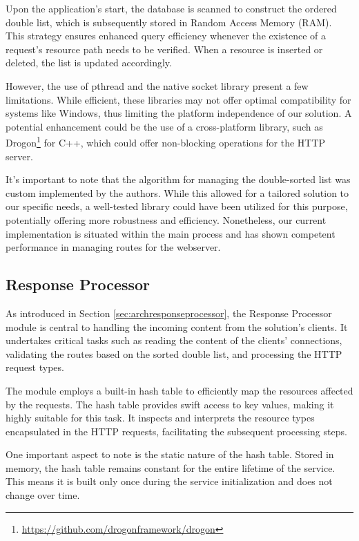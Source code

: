 \documentclass[a4paper,fleqn]{cas-dc}
\begin{document}
Upon the application's start, the database is scanned to construct the ordered double list, which is subsequently stored in Random Access Memory (RAM). This strategy ensures enhanced query efficiency whenever the existence of a request's resource path needs to be verified. When a resource is inserted or deleted, the list is updated accordingly.

However, the use of pthread and the native socket library present a few limitations. While efficient, these libraries may not offer optimal compatibility for systems like Windows, thus limiting the platform independence of our solution. A potential enhancement could be the use of a cross-platform library, such as Drogon\footnote{\url{https://github.com/drogonframework/drogon}} for C++, which could offer non-blocking operations for the HTTP server.

It's important to note that the algorithm for managing the double-sorted list was custom implemented by the authors. While this allowed for a tailored solution to our specific needs, a well-tested library could have been utilized for this purpose, potentially offering more robustness and efficiency. Nonetheless, our current implementation is situated within the main process and has shown competent performance in managing routes for the webserver.

\subsection{Response Processor}

As introduced in Section \ref{sec:archresponseprocessor}, the Response Processor module is central to handling the incoming content from the solution's clients. It undertakes critical tasks such as reading the content of the clients' connections, validating the routes based on the sorted double list, and processing the HTTP request types.

The module employs a built-in hash table to efficiently map the resources affected by the requests. The hash table provides swift access to key values, making it highly suitable for this task. It inspects and interprets the resource types encapsulated in the HTTP requests, facilitating the subsequent processing steps.

One important aspect to note is the static nature of the hash table. Stored in memory, the hash table remains constant for the entire lifetime of the service. This means it is built only once during the service initialization and does not change over time.
\end{document}
